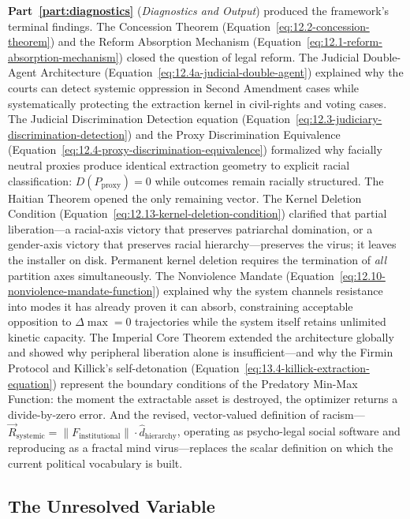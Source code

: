 \textbf{Part~\ref{part:diagnostics}} (\textit{Diagnostics and Output}) produced the framework's terminal findings. The Concession Theorem (Equation~\ref{eq:12.2-concession-theorem}) and the Reform Absorption Mechanism (Equation~\ref{eq:12.1-reform-absorption-mechanism}) closed the question of legal reform. The Judicial Double-Agent Architecture (Equation~\ref{eq:12.4a-judicial-double-agent}) explained why the courts can detect systemic oppression in Second Amendment cases while systematically protecting the extraction kernel in civil-rights and voting cases. The Judicial Discrimination Detection equation (Equation~\ref{eq:12.3-judiciary-discrimination-detection}) and the Proxy Discrimination Equivalence (Equation~\ref{eq:12.4-proxy-discrimination-equivalence}) formalized why facially neutral proxies produce identical extraction geometry to explicit racial classification: $D(P_{\text{proxy}}) = 0$ while outcomes remain racially structured. The Haitian Theorem opened the only remaining vector. The Kernel Deletion Condition (Equation~\ref{eq:12.13-kernel-deletion-condition}) clarified that partial liberation---a racial-axis victory that preserves patriarchal domination, or a gender-axis victory that preserves racial hierarchy---preserves the virus; it leaves the installer on disk. Permanent kernel deletion requires the termination of \textit{all} partition axes simultaneously. The Nonviolence Mandate (Equation~\ref{eq:12.10-nonviolence-mandate-function}) explained why the system channels resistance into modes it has already proven it can absorb, constraining acceptable opposition to $\Delta\max = 0$ trajectories while the system itself retains unlimited kinetic capacity. The Imperial Core Theorem extended the architecture globally and showed why peripheral liberation alone is insufficient---and why the Firmin Protocol and Killick's self-detonation (Equation~\ref{eq:13.4-killick-extraction-equation}) represent the boundary conditions of the Predatory Min-Max Function: the moment the extractable asset is destroyed, the optimizer returns a divide-by-zero error. And the revised, vector-valued definition of racism---$\vec{R}_{\text{systemic}} = \left\| F_{\text{institutional}} \right\| \cdot \hat{d}_{\text{hierarchy}}$, operating as psycho-legal social software and reproducing as a fractal mind virus---replaces the scalar definition on which the current political vocabulary is built.

\subsection*{The Unresolved Variable}

